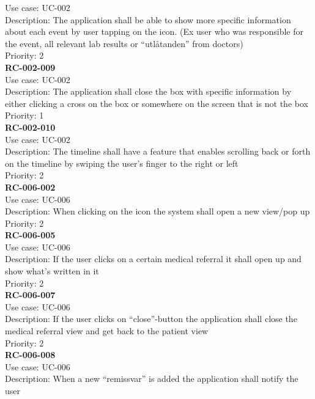 Use case: UC-002 \\
Description: The application shall be able to show more specific information about each event by user tapping on the icon. (Ex user who was responsible for the event, all relevant lab results or “utlåtanden” from doctors)\\
Priority: 2 \\
\newline
\textbf{RC-002-009} \\
Use case: UC-002 \\
Description: The application shall close the box with specific information by either clicking a cross on the box or somewhere on the screen that is not the box \\
Priority: 1 \\
\newline
\textbf{RC-002-010} \\
Use case: UC-002 \\
Description: The timeline shall have a feature that enables scrolling back or forth on the timeline by swiping the user’s finger to the right or left \\
Priority: 2 \\
\newline
\textbf{RC-006-002} \\
Use case: UC-006 \\
Description: When clicking on the icon the system shall open a new view/pop up \\
Priority: 2 \\
\newline
\textbf{RC-006-005} \\
Use case: UC-006 \\
Description: If the user clicks on a certain medical referral it shall open up and show what’s written in it \\
Priority: 2 \\
\newline
\textbf{RC-006-007} \\
Use case: UC-006 \\
Description: If the user clicks on “close”-button the application shall close the medical referral view and get back to the patient view \\
Priority: 2 \\
\newline
\textbf{RC-006-008} \\
Use case: UC-006 \\
Description: When a new “remissvar” is added the application shall notify the user  \\
